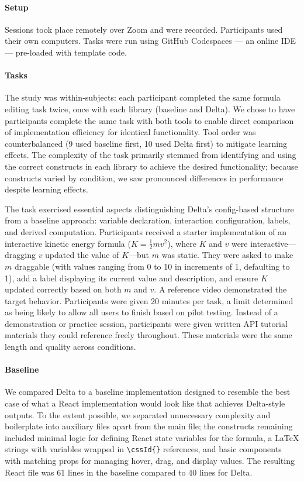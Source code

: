 \paragraph{Setup} Sessions took place remotely over Zoom and were recorded. Participants used their own computers. Tasks were run using GitHub Codespaces --- an online IDE --- pre-loaded with template code.

\paragraph{Tasks} The study was within-subjects: each participant completed the same formula editing task twice, once with each library (baseline and Delta). We chose to have participants complete the same task with both tools to enable direct comparison of implementation efficiency for identical functionality. Tool order was counterbalanced (9 used baseline first, 10 used Delta first) to mitigate learning effects. The complexity of the task primarily stemmed from identifying and using the correct constructs in each library to achieve the desired functionality; because constructs varied by condition, we saw pronounced differences in performance despite learning effects.

The task exercised essential aspects distinguishing Delta's config-based structure from a baseline approach: variable declaration, interaction configuration, labels, and derived computation. Participants received a starter implementation of an interactive kinetic energy formula ($K = \frac{1}{2}mv^2$), where $K$ and $v$ were interactive---dragging $v$ updated the value of $K$---but $m$ was static. They were asked to make $m$ draggable (with values ranging from 0 to 10 in increments of 1, defaulting to 1), add a label displaying its current value and description, and ensure $K$ updated correctly based on both $m$ and $v$. A reference video demonstrated the target behavior. Participants were given 20 minutes per task, a limit determined as being likely to allow all users to finish based on pilot testing. Instead of a demonstration or practice session, participants were given written API tutorial materials they could reference freely throughout. These materials were the same length and quality across conditions.

\paragraph{Baseline} We compared Delta to a baseline implementation designed to resemble the best case of what a React implementation would look like that achieves Delta-style outputs. To the extent possible, we separated unnecessary complexity and boilerplate into auxiliary files apart from the main file; the constructs remaining included 
minimal logic for defining React state variables for the formula, a LaTeX strings with variables wrapped in \texttt{\textbackslash cssId\{\}} references, and basic components with matching props for managing hover, drag, and display values. The resulting React file was 61 lines in the baseline compared to 40 lines for Delta.

